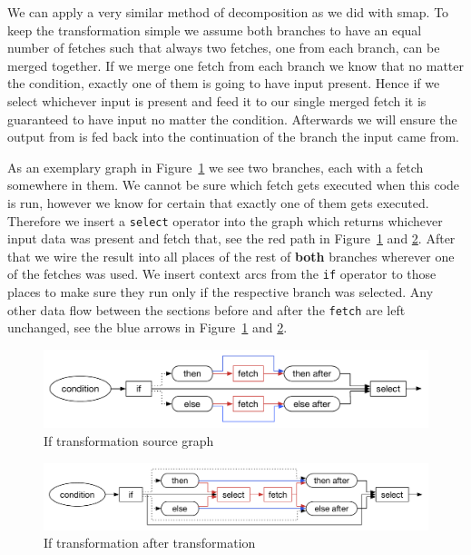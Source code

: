 We can apply a very similar method of decomposition as we did with smap.
To keep the transformation simple we assume both branches to have an equal number of fetches such that always two fetches, one from each branch, can be merged together.
If we merge one fetch from each branch we know that no matter the condition, exactly one of them is going to have input present.
Hence if we select whichever input is present and feed it to our single merged fetch it is guaranteed to have input no matter the condition.
Afterwards we will ensure the output from \fetch{} is fed back into the continuation of the branch the input came from.

As an exemplary graph in Figure~\ref{fig:if-trans-before} we see two branches, each with a fetch somewhere in them.
We cannot be sure which fetch gets executed when this code is run, however we know for certain that exactly one of them gets executed.
Therefore we insert a \texttt{select} operator into the graph which returns whichever input data was present and fetch that, see the red path in Figure~\ref{fig:if-trans-before} and \ref{fig:if-trans-merged}.
After that we wire the result into all places of the rest of \textbf{both} branches wherever one of the fetches was used.
We insert context arcs from the \texttt{if} operator to those places to make sure they run only if the respective branch was selected.
Any other data flow between the sections before and after the \texttt{fetch} are left unchanged, see the blue arrows in Figure~\ref{fig:if-trans-before} and \ref{fig:if-trans-merged}.

\begin{figure}
    \includegraphics[width=\linewidth]{../Figures/if-trans-before}
    \caption{If transformation source graph}
    \label{fig:if-trans-before}
\end{figure}

\begin{figure}
    \includegraphics[width=\linewidth]{../Figures/if-trans-merged}
    \caption{If transformation after transformation}
    \label{fig:if-trans-merged}
\end{figure}

